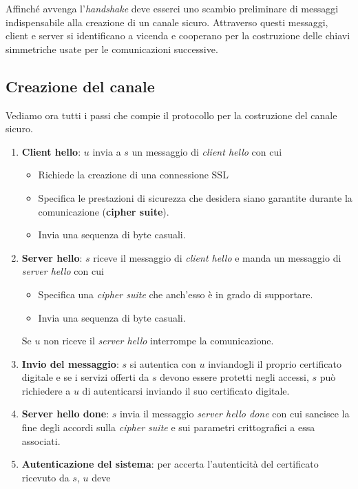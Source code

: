 Affinch\'e avvenga l'\emph{handshake} deve esserci uno scambio preliminare di messaggi indispensabile alla creazione
di un canale sicuro. Attraverso questi messaggi, client e server si identificano a vicenda e cooperano per la
costruzione delle chiavi simmetriche usate per le comunicazioni successive.

\subsection{Creazione del canale}
Vediamo ora tutti i passi che compie il protocollo per la costruzione del canale sicuro.

\begin{enumerate}
	\item \textbf{Client hello}: $u$ invia a $s$ un messaggio di \emph{client hello} con cui
	      \begin{itemize}
		      \item Richiede la creazione di una connessione SSL
		      \item Specifica le prestazioni di sicurezza che desidera siano garantite durante la comunicazione
		            (\textbf{cipher suite}).
		      \item Invia una sequenza di byte casuali.
	      \end{itemize}
	\item \textbf{Server hello}: $s$ riceve il messaggio di \emph{client hello} e manda un messaggio di
	      \emph{server hello} con cui
	      \begin{itemize}
		      \item Specifica una \emph{cipher suite} che anch'esso \`e in grado di supportare.
		      \item Invia una sequenza di byte casuali.
	      \end{itemize}
	      Se $u$ non riceve il \emph{server hello} interrompe la comunicazione.
	\item \textbf{Invio del messaggio}: $s$ si autentica con $u$ inviandogli il proprio certificato digitale e se
	      i servizi offerti da $s$ devono essere protetti negli accessi, $s$ pu\`o richiedere a $u$ di autenticarsi
	      inviando il suo certificato digitale.
	\item \textbf{Server hello done}: $s$ invia il messaggio \emph{server hello done} con cui sancisce la fine degli
	      accordi sulla \emph{cipher suite} e sui parametri crittografici a essa associati.
	\item \textbf{Autenticazione del sistema}: per accerta l'autenticit\`a del certificato ricevuto da $s$, $u$ deve

\end{enumerate}
